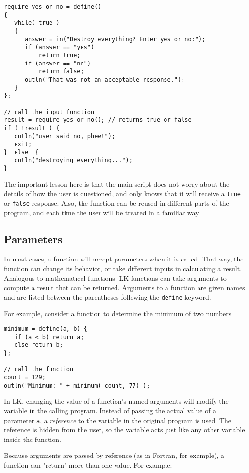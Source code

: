 \documentclass{article}
\begin{document}
\begin{verbatim}
require_yes_or_no = define()
{
   while( true )
   {
      answer = in("Destroy everything? Enter yes or no:");
      if (answer == "yes")
          return true;
      if (answer == "no")
          return false;
      outln("That was not an acceptable response.");
   }
};

// call the input function
result = require_yes_or_no(); // returns true or false
if ( !result ) {
   outln("user said no, phew!");
   exit;
}  else  {
   outln("destroying everything...");
}
\end{verbatim}

The important lesson here is that the main script does not worry about the details of how the user is questioned, and only knows that it will receive a \texttt{true} or \texttt{false} response.  Also, the function can be reused in different parts of the program, and each time the user will be treated in a familiar way.

\subsection{Parameters}

In most cases, a function will accept parameters when it is called.  That way, the function can change its behavior, or take different inputs in calculating a result.  Analogous to mathematical functions, LK functions can take arguments to compute a result that can be returned.  Arguments to a function are given names and are listed between the parentheses following the \texttt{define} keyword.  

For example, consider a function to determine the minimum of two numbers:

\begin{verbatim}
minimum = define(a, b) {
   if (a < b) return a;
   else return b;
};

// call the function
count = 129;
outln("Minimum: " + minimum( count, 77) );
\end{verbatim}

In LK, changing the value of a function's named arguments will modify the variable in the calling program.  Instead of passing the actual value of a parameter \texttt{a}, a \emph{reference} to the variable in the original program is used.  The reference is hidden from the user, so the variable acts just like any other variable inside the function.  

Because arguments are passed by reference (as in Fortran, for example), a function can "return" more than one value.  For example:
\end{document}
